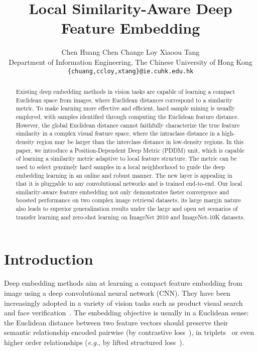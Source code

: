 \documentclass{article}
\title{Local Similarity-Aware Deep Feature Embedding}
\author{
  Chen Huang \quad\: Chen Change Loy \quad\: Xiaoou Tang\\
  Department of Information Engineering, The Chinese University of Hong Kong\\
  \texttt{\{chuang,ccloy,xtang\}@ie.cuhk.edu.hk} \\
}
\newcommand{\eg}{\emph{e.g.}}
\begin{document}
\maketitle

\begin{abstract}
Existing deep embedding methods in vision tasks are capable of learning a compact Euclidean space from images, where Euclidean distances correspond to a similarity metric.
To make learning more effective and efficient, hard sample mining is usually employed, with samples identified through computing the Euclidean feature distance.
However, the global Euclidean distance cannot faithfully characterize the true feature similarity in a complex visual feature space, where the intraclass distance in a high-density region may be larger than the interclass distance in low-density regions.
In this paper, we introduce a Position-Dependent Deep Metric (PDDM) unit, which is capable of learning a similarity metric adaptive to local feature structure. The metric can be used to select genuinely hard samples in a local neighborhood to guide the deep embedding learning in an online and robust manner. The new layer is appealing in that it is pluggable to any convolutional networks and is trained end-to-end.
Our local similarity-aware feature embedding not only demonstrates faster convergence and boosted performance on two complex image retrieval datasets, its large margin nature also leads to superior generalization results under the large and open set scenarios of transfer learning and zero-shot learning on ImageNet 2010 and ImageNet-10K datasets.

\end{abstract}

\section{Introduction}

Deep embedding methods aim at learning a compact feature embedding  from image  using a deep convolutional neural network (CNN). They have been increasingly adopted in a variety of vision tasks such as product visual search~\cite{Wang2014,bell15productnet,songCVPR16,huang2016unsupervised} and face verification~\cite{Schroff2015,huang2016lmle}. The embedding objective is usually in a Euclidean sense: the Euclidean distance  between two feature vectors should preserve their semantic relationship encoded pairwise (by contrastive loss~\cite{bell15productnet}), in triplets~\cite{Schroff2015,Wang2014} or even higher order relationships (\eg, by lifted structured loss~\cite{songCVPR16}).
\end{document}
